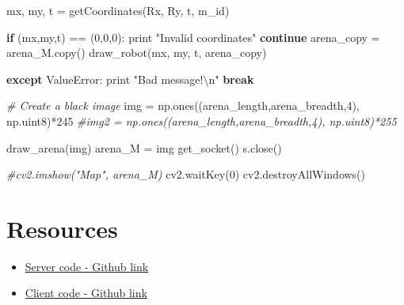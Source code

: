 \documentclass[]{article}
\newenvironment{Shaded}{}{}
\newcommand{\DecValTok}[1]{\textcolor[rgb]{0.25,0.63,0.44}{{#1}}}
\newcommand{\CharTok}[1]{\textcolor[rgb]{0.25,0.44,0.63}{{#1}}}
\newcommand{\StringTok}[1]{\textcolor[rgb]{0.25,0.44,0.63}{{#1}}}
\newcommand{\CommentTok}[1]{\textcolor[rgb]{0.38,0.63,0.69}{\textit{{#1}}}}
\newcommand{\ControlFlowTok}[1]{\textcolor[rgb]{0.00,0.44,0.13}{\textbf{{#1}}}}
\newcommand{\OperatorTok}[1]{\textcolor[rgb]{0.40,0.40,0.40}{{#1}}}
\newcommand{\BuiltInTok}[1]{{#1}}
\newcommand{\PreprocessorTok}[1]{\textcolor[rgb]{0.74,0.48,0.00}{{#1}}}
\newcommand{\NormalTok}[1]{{#1}}
\begin{document}
\begin{Shaded}
\begin{Highlighting}[]
            \NormalTok{mx, my, t }\OperatorTok{=} \NormalTok{getCoordinates(Rx, Ry, t, m_id)}

            \ControlFlowTok{if} \NormalTok{(mx,my,t) }\OperatorTok{==} \NormalTok{(}\DecValTok{0}\NormalTok{,}\DecValTok{0}\NormalTok{,}\DecValTok{0}\NormalTok{):}
                \BuiltInTok{print} \StringTok{"Invalid coordinates"}
                \ControlFlowTok{continue}
            \NormalTok{arena_copy }\OperatorTok{=} \NormalTok{arena_M.copy()}
            \NormalTok{draw_robot(mx, my, t, arena_copy)}
            
        \ControlFlowTok{except} \PreprocessorTok{ValueError}\NormalTok{:}
            \BuiltInTok{print} \StringTok{"Bad message!}\CharTok{\textbackslash{}n}\StringTok{"}
            \ControlFlowTok{break}

\CommentTok{# Create a black image}
\NormalTok{img }\OperatorTok{=} \NormalTok{np.ones((arena_length,arena_breadth,}\DecValTok{4}\NormalTok{), np.uint8)}\OperatorTok{*}\DecValTok{245}
\CommentTok{#img2 = np.ones((arena_length,arena_breadth,4), np.uint8)*255}

\NormalTok{draw_arena(img)}
\NormalTok{arena_M }\OperatorTok{=} \NormalTok{img}
\NormalTok{get_socket()}
\NormalTok{s.close()}

\CommentTok{#cv2.imshow("Map", arena_M)}
\NormalTok{cv2.waitKey(}\DecValTok{0}\NormalTok{)}
\NormalTok{cv2.destroyAllWindows()}
                                
\end{Highlighting}
\end{Shaded}

\section{Resources}
\begin{itemize}
	\item \href{https://github.com/eyantrainternship/eYSIP_2015_Marker_based_Robot_Localisation/blob/master/Task-7/Marker-based%20Localization/src/Server.py}{Server code - Github link}
	\item \href{https://github.com/eyantrainternship/eYSIP_2015_Marker_based_Robot_Localisation/blob/master/Task-7/Marker-based%20Localization/src/Server.py}{Client code - Github link}
\end{itemize}
\end{document}
